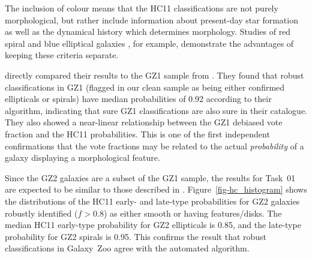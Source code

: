 \documentclass[useAMS,usenatbib]{mn2e}
\begin{document}
The inclusion of colour means that the HC11 classifications are not purely morphological, but rather include information about present-day star formation as well as the dynamical history which determines morphology. Studies of red spiral \citep{mas10a} and blue elliptical galaxies \citep{sch09}, for example, demonstrate the advantages of keeping these criteria separate. 

\citet{hue11} directly compared their results to the GZ1 sample from \citet{lin11}. They found that robust classifications in GZ1 (flagged in our clean sample as being either confirmed ellipticals or spirals) have median probabilities of 0.92 according to their algorithm, indicating that sure GZ1 classifications are also sure in their catalogue. They also showed a near-linear relationship between the GZ1 debiased vote fraction and the HC11 probabilities. This is one of the first independent confirmations that the vote fractions may be related to the actual {\em probability} of a galaxy displaying a morphological feature. 


Since the GZ2 galaxies are a subset of the GZ1 sample, the results for Task~01 are expected to be similar to those described in \citet{hue11}. Figure~\ref{fig-hc_histogram} shows the distributions of the HC11 early- and late-type probabilities for GZ2 galaxies robustly identified ($f>0.8$) as either smooth or having features/disks. The median HC11 early-type probability for GZ2 ellipticals is 0.85, and the late-type probability for GZ2 spirals is 0.95. This confirms the result that robust classifications in Galaxy~Zoo agree with the automated algorithm. 
\end{document}
